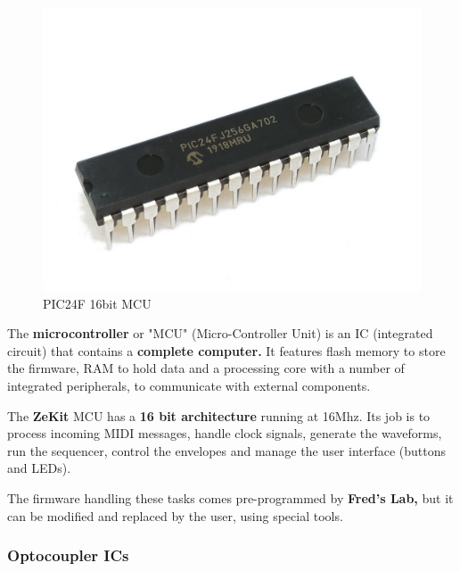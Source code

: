 \documentclass{scrartcl}
\begin{document}
\begin{figure}[!ht]
    \begin{center}
        \includegraphics[scale=0.10]{assets/zekit-mcu.jpg}
        \caption{PIC24F 16bit MCU}
    \end{center}
\end{figure}

The \textbf{microcontroller} or "MCU" (Micro-Controller Unit) is an IC (integrated circuit) that contains a \textbf{complete computer.} It features flash memory to store the firmware, RAM to hold data and a processing core with a number of integrated peripherals, to communicate with external components.

The \textbf{ZeKit} MCU has a \textbf{16 bit architecture} running at 16Mhz. Its job is to process incoming MIDI messages, handle clock signals, generate the waveforms, run the sequencer, control the envelopes and manage the user interface (buttons and LEDs).

The firmware handling these tasks comes pre-programmed by \textbf{Fred’s Lab,} but it can be modified and replaced by the user, using special tools.

\subsubsection{Optocoupler ICs}
\end{document}
